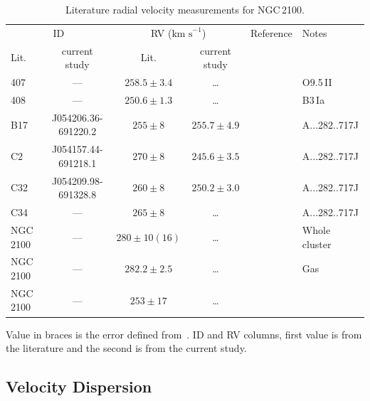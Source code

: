 \documentclass[useAMS,usenatbib]{mn2e}
\def\kms{$\mbox{km s}^{-1}$}
\begin{document}
\begin{table}
\begin{center}
\caption{
        Literature radial velocity measurements for NGC\,2100.\label{tb:rvs}
        }
\scriptsize
\begin{threeparttable}
\begin{tabular}{lcccll}
 \hline
 \hline
\multicolumn{2}{c}{ID} & \multicolumn{2}{c}{RV (\kms)}  & Reference & Notes \\
Lit. & current study & Lit. & current study\\
 \hline
407 & ---         & $258.5\pm3.4$     & \ldots        & \cite{2015arXiv150803490E} &  O9.5\,II  \\
408 & ---         & $250.6\pm1.3$     & \ldots        & \cite{2015arXiv150803490E} &  B3\,Ia    \\
B17 & J054206.36-691220.2 & $255\pm8$ & $255.7\pm4.9$ & {\cite{1994A&A...282..717J}} \\
C2  & J054157.44-691218.1 & $270\pm8$ & $245.6\pm3.5$ & {\cite{1994A&A...282..717J}} \\
C32 & J054209.98-691328.8 & $260\pm8$ & $250.2\pm3.0$ & {\cite{1994A&A...282..717J}} \\
C34 & ---         & $265\pm8$         & \ldots        & {\cite{1994A&A...282..717J}} & \\
NGC\,2100 & ---   & $280\pm10(16)$    & \ldots        & {\cite{1972MNRAS.159..445A}} & Whole cluster\\
NGC\,2100 & --- & $282.2\pm2.5$       & \ldots        & {\cite{1971ApJ...169..271S}} & Gas\\
NGC\,2100 & --- & $253\pm17$          & \ldots        & {\cite{1970PhD...........F}} & \\

\hline
\end{tabular}

\begin{tablenotes}
\item Value in braces is the error defined from~\cite{1983ApJ...272..488F}.
ID and RV columns, first value is from the literature and the second is from the current study.
\end{tablenotes}
\end{threeparttable}
\end{center}
\end{table}

\subsection{Velocity Dispersion} %
\label{sub:velocity_dispersion}
\end{document}
